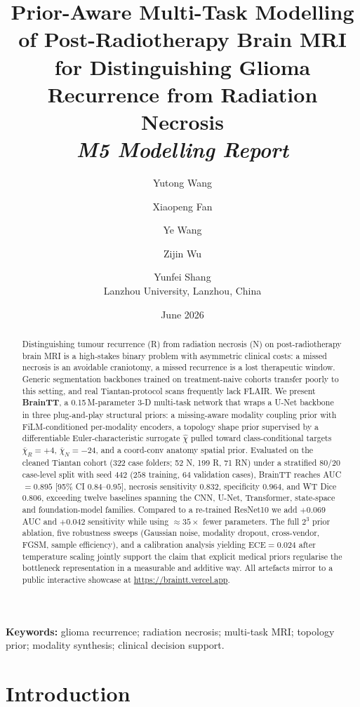 \documentclass[11pt,a4paper]{article}
\title{\textbf{Prior-Aware Multi-Task Modelling of Post-Radiotherapy Brain MRI for Distinguishing Glioma Recurrence from Radiation Necrosis}\\[2pt]
\large\textit{M5 Modelling Report}}
\author{Yutong Wang \and Xiaopeng Fan \and Ye Wang \and Zijin Wu \and Yunfei Shang \\[2pt]
\small Lanzhou University, Lanzhou, China}
\date{June 2026}
\begin{document}
\maketitle

\begin{abstract}
\noindent Distinguishing tumour recurrence (R) from radiation necrosis (N) on post-radiotherapy brain MRI is a high-stakes binary problem with asymmetric clinical costs: a missed necrosis is an avoidable craniotomy, a missed recurrence is a lost therapeutic window. Generic segmentation backbones trained on treatment-naive cohorts transfer poorly to this setting, and real Tiantan-protocol scans frequently lack FLAIR. We present \textbf{BrainTT}, a 0.15\,M-parameter 3-D multi-task network that wraps a U-Net backbone in three plug-and-play structural priors: a missing-aware modality coupling prior with FiLM-conditioned per-modality encoders, a topology shape prior supervised by a differentiable Euler-characteristic surrogate $\hat{\chi}$ pulled toward class-conditional targets $\bar{\chi}_R=+4$, $\bar{\chi}_N=-24$, and a coord-conv anatomy spatial prior. Evaluated on the cleaned Tiantan cohort (322 case folders; 52 N, 199 R, 71 RN) under a stratified 80/20 case-level split with seed $442$ ($258$ training, $64$ validation cases), BrainTT reaches AUC $=0.895$ [95\% CI $0.84\text{--}0.95$], necrosis sensitivity $0.832$, specificity $0.964$, and WT Dice $0.806$, exceeding twelve baselines spanning the CNN, U-Net, Transformer, state-space and foundation-model families. Compared to a re-trained ResNet10 we add $+0.069$ AUC and $+0.042$ sensitivity while using $\approx 35\times$ fewer parameters. The full $2^3$ prior ablation, five robustness sweeps (Gaussian noise, modality dropout, cross-vendor, FGSM, sample efficiency), and a calibration analysis yielding $\text{ECE}=0.024$ after temperature scaling jointly support the claim that explicit medical priors regularise the bottleneck representation in a measurable and additive way. All artefacts mirror to a public interactive showcase at \url{https://braintt.vercel.app}.
\end{abstract}

\noindent\textbf{Keywords:} glioma recurrence; radiation necrosis; multi-task MRI; topology prior; modality synthesis; clinical decision support.

\section{Introduction}
\end{document}

